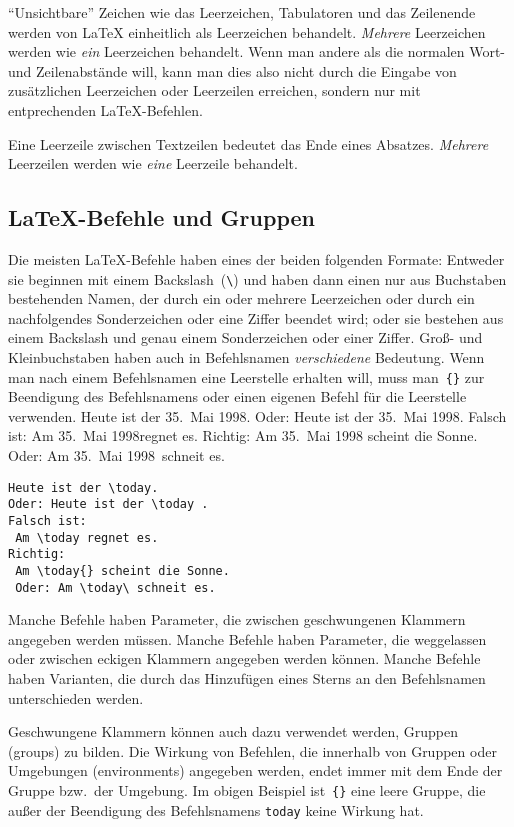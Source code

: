 "`Unsichtbare"' Zeichen wie das Leerzeichen, Tabulatoren
und das Zeilenende werden von \LaTeX{}
einheitlich als Leerzeichen behandelt.  \emph{Mehrere}
Leerzeichen werden wie \emph{ein} Leerzeichen behandelt.   
Wenn man andere als die normalen Wort- und Zeilenabstände
will, kann man dies also nicht durch die Eingabe von
zusätzlichen Leerzeichen oder Leerzeilen erreichen, sondern
nur mit entprechenden \LaTeX-Befehlen.

Eine Leerzeile zwischen Textzeilen bedeutet das Ende eines 
Absatzes.  \emph{Mehrere} Leerzeilen werden wie \emph{eine}
Leerzeile behandelt.
 
 
\subsection{\LaTeX-Befehle und Gruppen}
 
Die meisten \LaTeX-Befehle haben eines der beiden folgenden
Formate: Entweder sie beginnen mit einem Backslash~(\verb|\|)
und haben dann einen nur aus Buchstaben bestehenden Namen, der
durch ein oder mehrere Leerzeichen oder durch ein nachfolgendes
Sonderzeichen oder eine Ziffer beendet wird; oder sie bestehen
aus einem Backslash und genau einem Sonderzeichen oder einer
Ziffer.
Groß- und Kleinbuchstaben haben auch in Befehlsnamen
\emph{verschiedene} Bedeutung.
Wenn man nach einem Befehlsnamen eine Leerstelle erhalten will,
muss man~\verb|{}| zur Beendigung des Befehlsnamens oder einen
eigenen Befehl für die Leerstelle verwenden.
\exa
\renewcommand{\today}{35.~Mai 1998}  %
Heute ist der \today.
Oder: Heute ist der \today .
Falsch ist: Am \today regnet es.
Richtig: Am \today{} scheint die Sonne.
Oder: Am \today\ schneit es.
\exb
\begin{verbatim}
Heute ist der \today.
Oder: Heute ist der \today .
Falsch ist:
 Am \today regnet es.
Richtig:
 Am \today{} scheint die Sonne.
 Oder: Am \today\ schneit es.
\end{verbatim}
\exc
 
Manche Befehle haben Parameter, die zwischen geschwungenen
Klammern angegeben werden müssen.
Manche Befehle haben Parameter, die weggelassen oder zwischen
eckigen Klammern angegeben werden können.
Manche Befehle haben Varianten, die durch das Hinzufügen
eines Sterns an den Befehlsnamen unterschieden werden.

Geschwungene Klammern können auch dazu verwendet werden, Gruppen
(groups) zu bilden.
Die Wirkung von Befehlen, die innerhalb von Gruppen oder
Umgebungen (environments) angegeben werden, endet immer mit dem
Ende der Gruppe bzw.\ der Umgebung.  Im obigen Beispiel
ist~\verb|{}| eine leere Gruppe, die außer der Beendigung des
Befehlsnamens \texttt{today} keine Wirkung hat.
 
